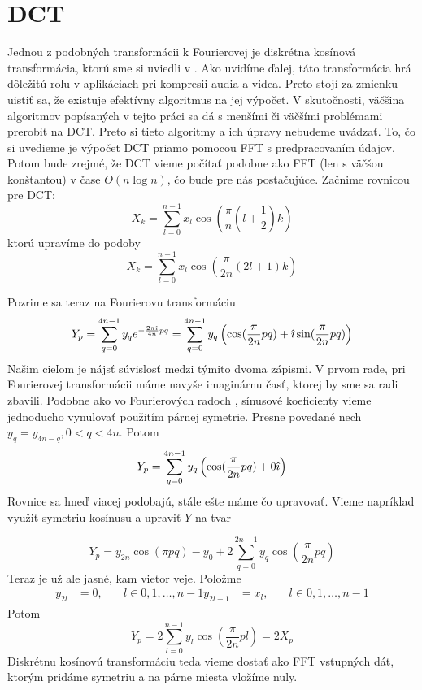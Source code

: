 \section{DCT}

Jednou z podobných transformácii k Fourierovej je diskrétna kosínová
transformácia, ktorú sme si uviedli v \todo{}. Ako uvidíme ďalej, táto
transformácia hrá dôležitú rolu v aplikáciach pri kompresii audia a
videa. Preto stojí za zmienku uistiť sa, že existuje efektívny
algoritmus na jej výpočet. V skutočnosti, väčšina algoritmov
popísaných v tejto práci sa dá s menšími či väčšími problémami
prerobiť na DCT. Preto si tieto algoritmy a ich úpravy nebudeme
uvádzať. To, čo si uvedieme je výpočet DCT priamo pomocou FFT s
predpracovaním údajov. Potom bude zrejmé, že DCT vieme počítať podobne
ako FFT (len s väčšou konštantou) v čase $O(n \log n)$,
čo bude pre nás postačujúce.
Začnime rovnicou pre DCT:
\begin{equation}
    X_k = \sum_{l=0}^{n-1} x_l \cos\left(
        \frac{\pi}{n} (l + \frac{1}{2}) k
        \right)
\end{equation}
ktorú upravíme do podoby
\begin{equation}
    X_k = \sum_{l=0}^{n-1} x_l \cos\left(
        \frac{\pi}{2n} (2l + 1) k
        \right)
\end{equation}

Pozrime sa teraz na Fourierovu transformáciu
\begin{equation}
    Y_p = \sum_{q=0}^{4n-1} y_q e^{-\frac{2\pi\hat{\imath}}{4n} p q} =
          \sum_{q=0}^{4n-1} y_q \left(
                \cos ( \frac{\pi}{2 n} p q )
                + \hat{\imath} \sin ( \frac{\pi}{2n} p q)
                \right)
\end{equation}
Našim cieľom je nájsť súvislosť medzi týmito dvoma zápismi. V prvom
rade, pri Fourierovej transformácii máme navyše imaginárnu časť,
ktorej by sme sa radi zbavili. Podobne ako vo Fourierových radoch
\todo{}, sínusové koeficienty vieme jednoducho vynulovať použitím
párnej symetrie. Presne povedané nech $y_q = y_{4n-q}, 0<q<4n$.
Potom
\begin{equation}
    Y_p =    \sum_{q=0}^{4n-1} y_q \left(
                \cos ( \frac{\pi}{2 n} p q )
                +  0 \hat{\imath} 
                \right)
\end{equation}
Rovnice  sa hneď viacej podobajú, stále ešte máme čo
upravovať. Vieme napríklad využiť symetriu kosínusu a upraviť $Y$ na
tvar

\begin{equation}
    Y_p =  y_{2n} \cos( \pi pq) - y_0 + 2 \sum_{q=0}^{2n-1} y_q 
                \cos ( \frac{\pi}{2 n} p q )
\end{equation}
Teraz je už ale jasné, kam vietor veje. Položme
\begin{align}
    y_{2l} &= 0, \quad & l\in 0,1, \dots, n-1
    y_{2l+1} &= x_l, \quad & l \in 0,1, \dots, n-1
\end{align}
Potom
\begin{equation}
    Y_p = 2 \sum_{l=0}^{n-1} y_l 
                \cos ( \frac{\pi}{2 n} p l ) = 2 X_p
\end{equation}
Diskrétnu kosínovú transformáciu teda vieme dostať ako
FFT vstupných dát, ktorým pridáme symetriu a na párne miesta vložíme
nuly.

